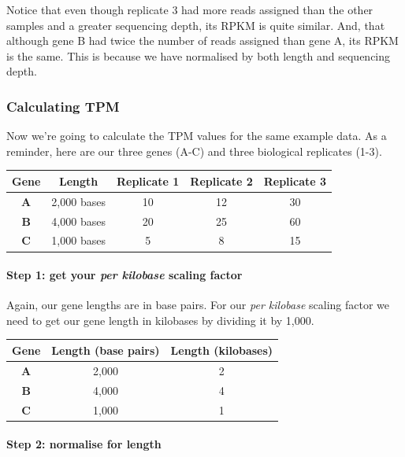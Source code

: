 \documentclass[11pt]{article}
\begin{document}
Notice that even though replicate 3 had more reads assigned than the
other samples and a greater sequencing depth, its RPKM is quite similar.
And, that although gene B had twice the number of reads assigned than
gene A, its RPKM is the same. This is because we have normalised by both
length and sequencing depth.

    \hypertarget{calculating-tpm}{%
\subsubsection{Calculating TPM}\label{calculating-tpm}}

Now we're going to calculate the TPM values for the same example data.
As a reminder, here are our three genes (A-C) and three biological
replicates (1-3).

\begin{longtable}[]{@{}ccccc@{}}
\toprule
Gene & Length & Replicate 1 & Replicate 2 & Replicate 3\tabularnewline
\midrule
\endhead
\textbf{A} & 2,000 bases & 10 & 12 & 30\tabularnewline
\textbf{B} & 4,000 bases & 20 & 25 & 60\tabularnewline
\textbf{C} & 1,000 bases & 5 & 8 & 15\tabularnewline
\bottomrule
\end{longtable}

\hypertarget{step-1-get-your-per-kilobase-scaling-factor}{%
\paragraph{\texorpdfstring{Step 1: get your \textit{per kilobase} scaling
factor}{Step 1: get your per kilobase scaling factor}}\label{step-1-get-your-per-kilobase-scaling-factor}}

Again, our gene lengths are in base pairs. For our \textit{per kilobase}
scaling factor we need to get our gene length in kilobases by dividing
it by 1,000.

\begin{longtable}[]{@{}ccc@{}}
\toprule
Gene & Length (base pairs) & Length (kilobases)\tabularnewline
\midrule
\endhead
\textbf{A} & 2,000 & 2\tabularnewline
\textbf{B} & 4,000 & 4\tabularnewline
\textbf{C} & 1,000 & 1\tabularnewline
\bottomrule
\end{longtable}

\hypertarget{step-2-normalise-for-length}{%
\paragraph{Step 2: normalise for
length}\label{step-2-normalise-for-length}}
\end{document}
